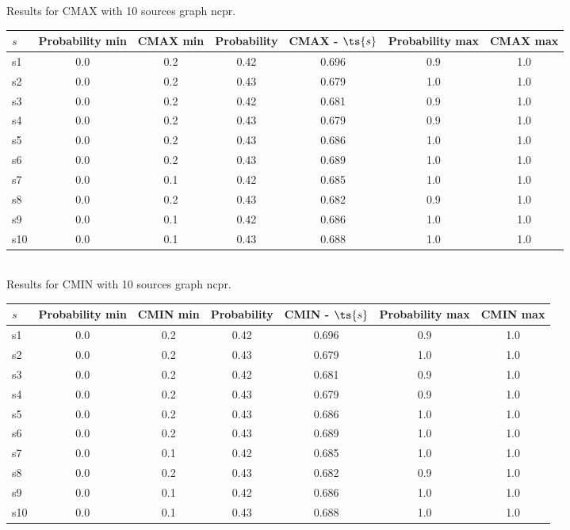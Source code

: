 \documentclass{article}
\begin{document}
\noindent Results for CMAX with 10 sources graph ncpr.

\noindent\begin{tabular}{|l|c|c|c|c|c|c|}
\hline
$s$& Probability min & CMAX min & Probability & CMAX - $\ts{s}$ & Probability max & CMAX max\\
\hline
s1 &0.0 & 0.2 & 0.42 & 0.696 & 0.9 & 1.0\\
\hline
s2 &0.0 & 0.2 & 0.43 & 0.679 & 1.0 & 1.0\\
\hline
s3 &0.0 & 0.2 & 0.42 & 0.681 & 0.9 & 1.0\\
\hline
s4 &0.0 & 0.2 & 0.43 & 0.679 & 0.9 & 1.0\\
\hline
s5 &0.0 & 0.2 & 0.43 & 0.686 & 1.0 & 1.0\\
\hline
s6 &0.0 & 0.2 & 0.43 & 0.689 & 1.0 & 1.0\\
\hline
s7 &0.0 & 0.1 & 0.42 & 0.685 & 1.0 & 1.0\\
\hline
s8 &0.0 & 0.2 & 0.43 & 0.682 & 0.9 & 1.0\\
\hline
s9 &0.0 & 0.1 & 0.42 & 0.686 & 1.0 & 1.0\\
\hline
s10 &0.0 & 0.1 & 0.43 & 0.688 & 1.0 & 1.0\\
\hline
\end{tabular}\\

\noindent Results for CMIN with 10 sources graph ncpr.

\noindent\begin{tabular}{|l|c|c|c|c|c|c|}
\hline
$s$& Probability min & CMIN min & Probability & CMIN - $\ts{s}$ & Probability max & CMIN max\\
\hline
s1 &0.0 & 0.2 & 0.42 & 0.696 & 0.9 & 1.0\\
\hline
s2 &0.0 & 0.2 & 0.43 & 0.679 & 1.0 & 1.0\\
\hline
s3 &0.0 & 0.2 & 0.42 & 0.681 & 0.9 & 1.0\\
\hline
s4 &0.0 & 0.2 & 0.43 & 0.679 & 0.9 & 1.0\\
\hline
s5 &0.0 & 0.2 & 0.43 & 0.686 & 1.0 & 1.0\\
\hline
s6 &0.0 & 0.2 & 0.43 & 0.689 & 1.0 & 1.0\\
\hline
s7 &0.0 & 0.1 & 0.42 & 0.685 & 1.0 & 1.0\\
\hline
s8 &0.0 & 0.2 & 0.43 & 0.682 & 0.9 & 1.0\\
\hline
s9 &0.0 & 0.1 & 0.42 & 0.686 & 1.0 & 1.0\\
\hline
s10 &0.0 & 0.1 & 0.43 & 0.688 & 1.0 & 1.0\\
\hline
\end{tabular}\\
\end{document}
